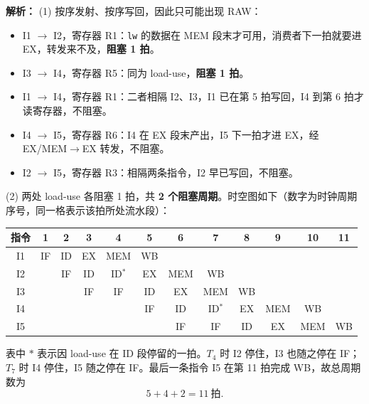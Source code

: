 \begin{enumerate}[resume]
\ifshowsolutions\par\noindent\textbf{解析：} (1) 按序发射、按序写回，因此只可能出现 RAW：
\begin{itemize}
    \item I1 $\to$ I2，寄存器 R1：\texttt{lw} 的数据在 MEM 段末才可用，消费者下一拍就要进 EX，转发来不及，\textbf{阻塞 1 拍}。
    \item I3 $\to$ I4，寄存器 R5：同为 load-use，\textbf{阻塞 1 拍}。
    \item I1 $\to$ I4，寄存器 R1：二者相隔 I2、I3，I1 已在第 5 拍写回，I4 到第 6 拍才读寄存器，不阻塞。
    \item I4 $\to$ I5，寄存器 R6：I4 在 EX 段末产出，I5 下一拍才进 EX，经 EX/MEM$\to$EX 转发，不阻塞。
    \item I2 $\to$ I5，寄存器 R3：相隔两条指令，I2 早已写回，不阻塞。
\end{itemize}

(2) 两处 load-use 各阻塞 1 拍，共 \textbf{2 个阻塞周期}。时空图如下（数字为时钟周期序号，同一格表示该拍所处流水段）：
\begin{center}
\setlength{\tabcolsep}{4.2pt}
\small
\begin{tabular}{|c|c|c|c|c|c|c|c|c|c|c|c|}
\hline
指令 & 1 & 2 & 3 & 4 & 5 & 6 & 7 & 8 & 9 & 10 & 11 \\
\hline
I1 & IF & ID & EX & MEM & WB & & & & & & \\
\hline
I2 & & IF & ID & ID$^*$ & EX & MEM & WB & & & & \\
\hline
I3 & & & IF & IF & ID & EX & MEM & WB & & & \\
\hline
I4 & & & & & IF & ID & ID$^*$ & EX & MEM & WB & \\
\hline
I5 & & & & & & IF & IF & ID & EX & MEM & WB \\
\hline
\end{tabular}
\end{center}
表中 $*$ 表示因 load-use 在 ID 段停留的一拍。$T_4$ 时 I2 停住，I3 也随之停在 IF；$T_7$ 时 I4 停住，I5 随之停在 IF。最后一条指令 I5 在第 11 拍完成 WB，故总周期数为
\[
5+4+2=11\ \text{拍}.
\]


\end{enumerate}
